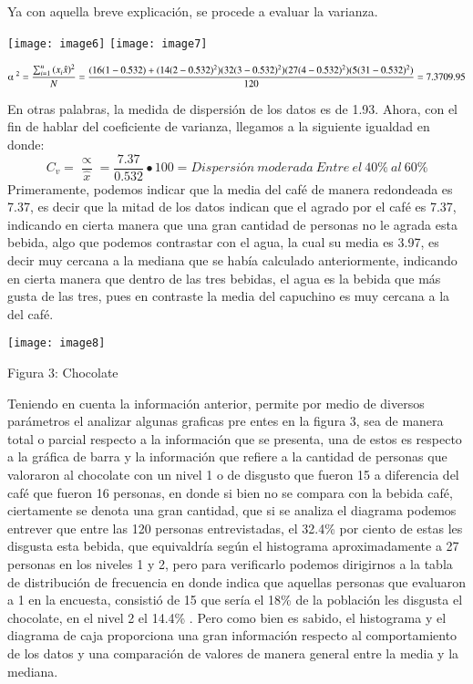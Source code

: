 \documentclass{article} %
\begin{document}
\noindent Ya con aquella breve explicaci\'{o}n, se procede a evaluar la varianza.

\noindent 

\noindent \texttt{[image: image6]}  \texttt{[image: image7]}

\noindent 
\[{\mathrm{\alphaup }\mathrm{\ }}^2=\frac{\sum^n_{i=1}{{(x}_i\hat{x})^2}}{N}=\frac{(16(1-0.532)+(14(2-0.532)^2)(32(3-0.532)^2)(27(4-0.532)^2)(5(31-0.532)^2)}{120}=7.3709.95\] 


\noindent En otras palabras, la medida de dispersi\'{o}n de los datos es de 1.93. Ahora, con el fin de hablar del coeficiente de varianza, llegamos a la siguiente igualdad en donde:
\[C_v=\frac{\propto }{\hat{x}}=\frac{7.37}{0.532}\bullet 100=Dispersi\textrm{\'{o}}n\ moderada\ Entre\ el\ 40\%\ al\ 60\%\] 
Primeramente, podemos indicar que la media del caf\'{e} de manera redondeada es 7.37, es decir que la mitad de los datos indican que el agrado por el caf\'{e} es 7.37, indicando en cierta manera que una gran cantidad de personas no le agrada esta bebida, algo que podemos contrastar con el agua, la cual su media es 3.97, es decir muy cercana a la mediana que se hab\'{i}a calculado anteriormente, indicando en cierta manera que dentro de las tres bebidas, el agua es la bebida que m\'{a}s gusta de las tres, pues en contraste la media del capuchino es  muy cercana a la del caf\'{e}.

\noindent 

\noindent \texttt{[image: image8]}

\noindent 

\noindent 

\noindent 

\noindent 

\noindent 

\noindent Figura 3: Chocolate

\noindent 

\noindent Teniendo en cuenta la informaci\'{o}n anterior, permite por medio de diversos par\'{a}metros el analizar algunas graficas pre entes en la figura 3, sea de manera total o parcial respecto a la informaci\'{o}n que se presenta, una de estos es  respecto a la gr\'{a}fica de barra y la informaci\'{o}n  que refiere a la cantidad de personas que valoraron al chocolate con un nivel 1 o de disgusto que fueron 15 a diferencia del caf\'{e} que fueron 16 personas, en donde si bien no se compara con la bebida caf\'{e}, ciertamente se denota una gran cantidad, que si se analiza el diagrama  podemos entrever que entre las 120 personas entrevistadas, el 32.4\% por ciento de estas les disgusta esta bebida, que equivaldr\'{i}a seg\'{u}n el histograma aproximadamente a 27 personas en los niveles 1 y 2, pero para verificarlo podemos dirigirnos a la tabla de distribuci\'{o}n de frecuencia en donde indica que aquellas personas que evaluaron a 1 en la encuesta, consisti\'{o} de 15 que ser\'{i}a el 18\% de la poblaci\'{o}n les disgusta el chocolate, en el nivel 2 el 14.4\% . Pero como bien es sabido, el histograma y el diagrama de caja proporciona una gran informaci\'{o}n respecto al comportamiento de los datos y una comparaci\'{o}n de valores de manera general entre la media y la mediana.
\end{document}
